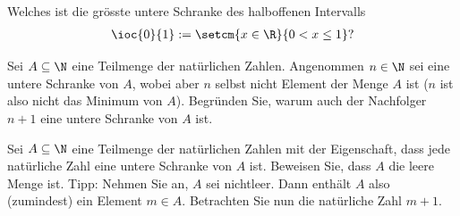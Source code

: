 \begin{myexercise}\label{myexercise:0298}
	Welches ist die grösste untere Schranke des halboffenen Intervalls
	\begin{align*}
		\ioc{0}{1} := \setcm{x\in\R}{0<x\leq 1}?
	\end{align*}
\end{myexercise}

\begin{myexercise}\label{myexercise:0297}
	\begin{aenum}
		\item Sei $A\subseteq\N$ eine Teilmenge der natürlichen Zahlen.
		Angenommen $n\in\N$ sei eine untere Schranke von $A$, wobei aber $n$ selbst nicht Element der Menge $A$ ist ($n$ ist also nicht das Minimum von $A$). Begründen Sie, warum auch der Nachfolger $n+1$ eine untere Schranke von $A$ ist.
		\item Sei $A\subseteq\N$ eine Teilmenge der natürlichen Zahlen mit der Eigenschaft, dass jede natürliche Zahl eine untere Schranke von $A$ ist. Beweisen Sie, dass $A$ die leere Menge ist. Tipp: Nehmen Sie an, $A$ sei nichtleer. Dann enthält $A$ also (zumindest) ein Element $m\in A$. Betrachten Sie nun die natürliche Zahl $m+1$.
	\end{aenum}
\end{myexercise}


